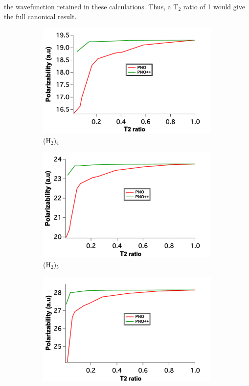 the wavefunction retained in these calculations. Thus, a T$_2$ ratio of 1
would give the full canonical result.
\begin{figure}
\begin{subfigure}{.5\textwidth}
  \centering
  \includegraphics[width=.9\linewidth]{figures_pno++/pno++_h2_4_adz_polar.pdf}
  \caption{(H$_2$)$_4$}
  \label{fig:sfig1}
\end{subfigure}%
\begin{subfigure}{.5\textwidth}
  \centering
  \includegraphics[width=.9\linewidth]{figures_pno++/pno++_h2_5_adz_polar.pdf}
  \caption{(H$_2$)$_5$}
  \label{fig:sfig2}
\end{subfigure}
\begin{subfigure}{.5\textwidth}
  \centering
  \includegraphics[width=.9\linewidth]{figures_pno++/pno++_h2_6_adz_polar.pdf}

\end{subfigure}
\end{figure}
